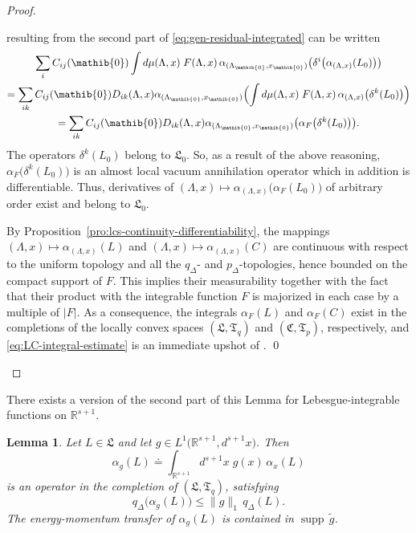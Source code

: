 \documentclass[a4paper,a4paper]{article}
\numberwithin{equation}{section}
\newcommand{\Cfrak}{\mathfrak{C}}
\newcommand{\Lfrak}{\mathfrak{L}}
\newcommand{\Tfrak}{\mathfrak{T}}
\newcommand{\zeroib}{\mathib{0}}
\newcommand{\Rsone}{\mathbb{R}^{s + 1}}
\newcommand{\aLax}{\alpha_{( \Lambda , x )}}
\newcommand{\ax}{\alpha_x}
\newcounter{proofitem}
\newenvironment{prooflist}{\begin{list}{(\roman{proofitem})}%
  {\usecounter{proofitem} \setlength{\topsep}{0ex}%
   \setlength{\parsep}{0.2ex} \setlength{\itemsep}{0.4ex}%
   \setlength{\leftmargin}{0em} \setlength{\itemindent}{0.5em}%
   \setlength{\listparindent}{1em}}}{\qed \end{list}}
\theoremstyle{definition}
\theoremstyle{plain}
\newtheorem{lemma}[definition]{Lemma}
\theoremstyle{remark}
\DeclareMathOperator{\supp}{supp}
\newcommand{\abs}[1]{\lvert #1 \rvert}
\newcommand{\norm}[1]{\lVert #1 \rVert}
\newcommand{\pD}{p_\Delta}
\newcommand{\qD}{q_\Delta}
\newcommand{\qDx}[1]{q_\Delta ( #1 )}
\newcommand{\bqDx}[1]{q_\Delta \bigl( #1 \bigr)}
\begin{document}
\begin{proof}
\begin{prooflist}
      resulting from the second part of
      \eqref{eq:gen-residual-integrated} can be written
      \begin{multline*}
        \sum_i C_{i j} ( \zeroib ) \int d \mu ( \Lambda , x ) \; F (
        \Lambda , x ) \, \alpha_{( \Lambda_\zeroib , x_\zeroib )}
        \bigl( \delta^i \bigl( \aLax ( L_0 ) \bigr) \bigr) \\
        = \sum_{i k} C_{i j} ( \zeroib ) D_{i k} ( \Lambda , x )
        \alpha_{( \Lambda_\zeroib , x_\zeroib )} \Bigl( \int d \mu (
        \Lambda , x ) \; F ( \Lambda , x ) \, \aLax \bigl( \delta^k (
        L_0 ) \bigr) \Bigr) \\
        = \sum_{i k} C_{i j} ( \zeroib ) D_{i k} ( \Lambda , x )
        \alpha_{( \Lambda_\zeroib , x_\zeroib )} \bigl( \alpha_F
        \bigl( \delta^k ( L_0 ) \bigr) \bigr) \text{.}
      \end{multline*}
      The operators $\delta^k ( L_0 )$ belong to $\Lfrak_0$.  So, as a
      result of the above reasoning, $\alpha_F \bigl( \delta^k ( L_0 )
      \bigr)$ is an almost local vacuum annihilation operator which in
      addition is differentiable. Thus, derivatives of $( \Lambda , x
      ) \mapsto \aLax \bigl( \alpha_F ( L_0 ) \bigr)$ of arbitrary
      order exist and belong to $\Lfrak_0$.
    \item By Proposition~\ref{pro:lcs-continuity-differentiability},
      the mappings $( \Lambda , x ) \mapsto \aLax ( L )$ and $(
      \Lambda , x ) \mapsto \aLax ( C )$ are continuous with respect
      to the uniform topology and all the $\qD$- and $\pD$-topologies,
      hence bounded on the compact support of $F$. This implies their
      measurability together with the fact that their product with the
      integrable function $F$ is majorized in each case by a multiple
      of $\abs{F}$. As a consequence, the integrals $\alpha_F ( L )$
      and $\alpha_F ( C )$ exist in the completions of the locally
      convex spaces $( \Lfrak , \Tfrak_q )$ and $( \Cfrak , \Tfrak_p
      )$, respectively, and \eqref{eq:LC-integral-estimate} is an
      immediate upshot of \cite[II.6.2 and 5.4]{fell/doran:1988a}.
    \end{prooflist}
    \renewcommand{\qed}{}
  \end{proof}
  There exists a version of the second part of this Lemma for
  Lebesgue-integrable functions on $\Rsone$.
  \begin{lemma}
    \label{lem:Lebesgue-Bochner-integrals}
    Let $L \in \Lfrak$ and let $g \in L^1 \bigl( \Rsone , d^{s + 1} x
    \bigr)$. Then
    \begin{equation}
      \label{eq:alpha-g-def}
      \alpha_g ( L ) \doteq \int_{\Rsone} d^{s + 1} x \; g ( x ) \,
      \ax ( L )
    \end{equation}
    is an operator in the completion of $( \Lfrak , \Tfrak_q )$,
    satisfying
    \begin{equation}
      \label{eq:alpha-g-estimates}
      \bqDx{\alpha_g ( L )} \leqslant \norm{g}_1 \, \qDx{L} \text{.}
    \end{equation}
    The energy-momentum transfer of $\alpha_g (L)$ is contained in
    $\supp \, \tilde{g}$.
  \end{lemma}
\end{document}
